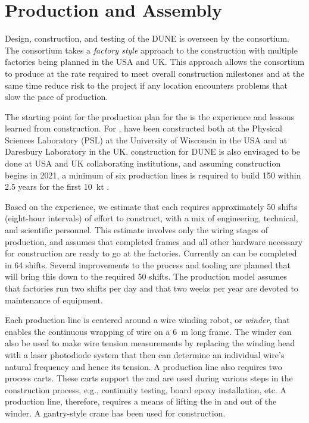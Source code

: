\section{Production and Assembly}
\label{sec:fdsp-apa-prod-assy}

Design, construction, and testing of the DUNE   is overseen by the  consortium. %
The  consortium takes a \textit{factory style} approach to the construction with multiple factories being planned in the USA and UK. This approach allows the consortium to produce  at the rate required to meet overall construction milestones and at the same time reduce risk to the project if any location encounters problems that slow the pace of production.

The starting point for the  production plan for the  is the experience and lessons learned from  construction. For ,  have been constructed both at the Physical Sciences Laboratory (PSL) at the University of Wisconsin in the USA and at Daresbury Laboratory in the UK.   construction for DUNE is also envisaged to be done at USA and UK collaborating institutions, and assuming construction begins in 2021, a minimum of six production lines is required to build \num{150}  within \num{2.5} years for the first %
\SI{10}{kt} .   

Based on the  experience, we estimate that each  requires approximately \num{50} shifts (eight-hour intervals) of effort to construct, with a mix of engineering, technical, and scientific personnel. This estimate involves only the wiring stages of production, and assumes that completed frames and all other hardware necessary for construction are ready to go at the factories. Currently an  can be completed in \num{64} shifts. Several improvements to the process and tooling are planned that will bring this down to the required \num{50} shifts. The production model assumes that factories run two shifts per day and that two weeks per year are devoted to maintenance of equipment. 

Each production line is centered around a wire winding robot, or \textit{winder}, that enables the continuous wrapping of wire on a \SI{6}{m} long frame. The winder can also be used to make wire tension measurements by replacing the winding head with a laser photodiode system that then can determine an individual wire's natural frequency and hence its tension. A production line also requires two process carts. These carts support the  and are used during various steps in the construction process, e.g., continuity testing, board epoxy installation, etc. A production line, therefore, requires a means of lifting the  in and out of the winder. A gantry-style crane has been used for  construction.

